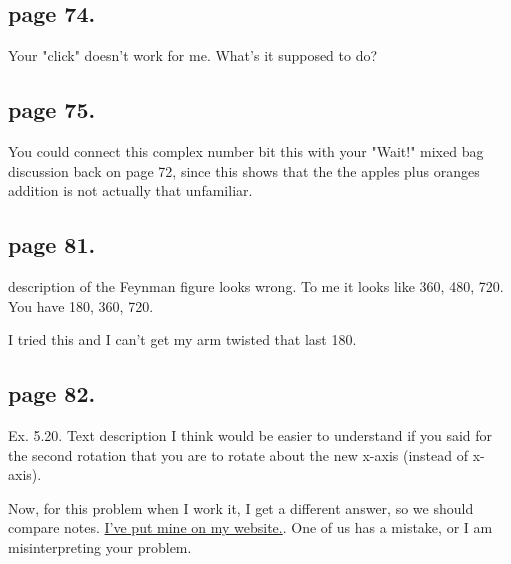 \documentclass{article}
\begin{document}
\subsection{ page 74.}

Your "click" doesn't work for me. What's it supposed to do?

\subsection{ page 75. }

You could connect this complex number bit this with your "Wait!" mixed bag discussion back on page 72, since this
shows that the the apples plus oranges addition is not actually that unfamiliar.

\subsection{ page 81. }

description of the Feynman figure looks wrong.  To me it looks like 360, 480, 720.  You have 180, 360, 720.

I tried this and I can't get my arm twisted that last 180.

\subsection{ page 82. } 

Ex. 5.20.  Text description I think would be easier to understand if you said for the second rotation that you are to
rotate about the new x-axis (instead of x-axis).

Now, for this problem when I work it, I get a different answer, so we should
compare notes.  \href{http://sites.google.com/site/peeterjoot/math2009/two_ninety_rotations.pdf}{I've put mine on my website.}.  One of us has a mistake, or I am misinterpreting your problem.


%
%
\end{document}
